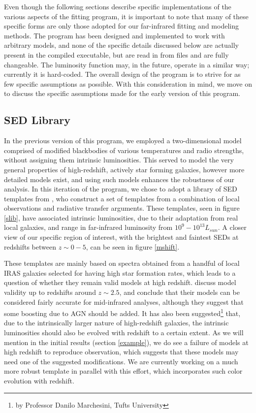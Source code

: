 \documentclass[twocolumn,letterpaper,10pt]{article}
\begin{document}
Even though the following sections describe specific implementations of the various aspects of the fitting program, it is important to note that many of these specific forms are only those adopted for our far-infrared fitting and modeling methods. The program has been designed and implemented to work with arbitrary models, and none of the specific details discussed below are actually present in the compiled executable, but are read in from files and are fully changeable. The luminosity function may, in the future, operate in a similar way; currently it is hard-coded. The overall design of the program is to strive for as few specific assumptions as possible. With this consideration in mind, we move on to discuss the specific assumptions made for the early version of this program.

\subsection{SED Library}\label{sec:SED}

In the previous version of this program, we employed a two-dimensional model comprised of modified blackbodies of various temperatures and radio strengths, without assigning them intrinsic luminosities. This served to model the very general properties of high-redshift, actively star forming galaxies, however more detailed models exist, and using such models enhances the robustness of our analysis. In this iteration of the program, we chose to adopt a library of SED templates from \citet{rieke09}, who construct a set of templates from a combination of local observations and radiative transfer arguments. These templates, seen in figure \ref{slib}, have associated intrinsic luminosities, due to their adaptation from real local galaxies, and range in far-infrared luminosity from $10^9 - 10^{13} L_{sun}$. A closer view of our specific region of interest, with the brightest and faintest SEDs at redshifts between $z\sim 0-5$, can be seen in figure \ref{mshift}.

These templates are mainly based on spectra obtained from a handful of local IRAS galaxies selected for having high star formation rates, which leads to a question of whether they remain valid models at high redshift. \citet{rieke09} discuss model validity up to redshifts around $z\sim2.5$, and conclude that their models can be considered fairly accurate for mid-infrared analyses, although they suggest that some boosting due to AGN should be added. It has also been suggested\footnote{by Professor Danilo Marchesini, Tufts University} that, due to the intrinsically larger nature of high-redshift galaxies, the intrinsic luminosities should also be evolved with redshift to a certain extent. As we will mention in the initial results (section \ref{example}), we do see a failure of models at high redshift to reproduce observation, which suggests that these models may need one of the suggested modifications. We are currently working on a much more robust template in parallel with this effort, which incorporates such color evolution with redshift.
\end{document}
